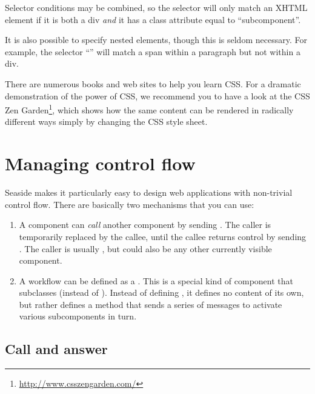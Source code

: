 \documentclass[a4paper,10pt,twoside]{book}
\begin{document}

Selector conditions may be combined, so the selector  will only match an XHTML element if it is both a div \emph{and} it has a class attribute equal to ``subcomponent''.

It is also possible to specify nested elements, though this is seldom necessary.
For example, the selector ``'' will match a span within a paragraph but not within a div.

There are numerous books and web sites to help you learn CSS.
For a dramatic demonstration of the power of CSS, we recommend you to have a look at the CSS Zen Garden\footnote{\url{http://www.csszengarden.com/}}, which shows how the same content can be rendered in radically different ways simply by changing the CSS style sheet.

\section{Managing control flow}

Seaside makes it particularly easy to design web applications with non-trivial control flow.
There are basically two mechanisms that you can use:

\begin{enumerate}
  \item A component can \emph{call} another component by sending .
  The caller is temporarily replaced by the callee, until the callee returns control by sending .
  The caller is usually , but could also be any other currently visible component.

  \item A workflow can be defined as a .
  This is a special kind of component that subclasses  (instead of ). 
  Instead of defining , it defines no content of its own, but rather defines a  method that sends a series of  messages to activate various subcomponents in turn.
\end{enumerate}

\subsection{Call and answer}
\end{document}
